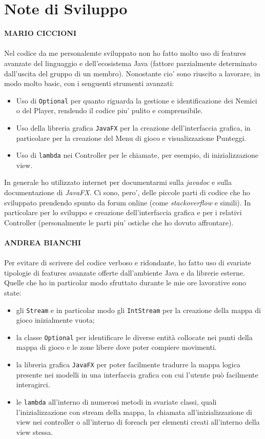 \documentclass[a4paper,12pt]{report}
\begin{document}
\section{Note di Sviluppo}
\textbf{MARIO CICCIONI}
\\ \\
Nel codice da me personalemte sviluppato non ho fatto molto uso di features avanzate del linguaggio e dell'ecosistema Java (fattore parzialmente determinato dall'uscita del gruppo di un membro). 
Nonostante cio' sono riuscito a lavorare, in modo molto basic, con i senguenti strumenti avanzati:
\begin{itemize}
    \item Uso di \verb|Optional| per quanto riguarda la gestione e identificazione dei Nemici o del Player, rendendo il codice piu' pulito e comprensibile.
    \item Uso della libreria grafica \verb|JavaFX| per la creazione dell'interfaccia grafica, in particolare per la creazione del Menu di gioco e visualizzazione Punteggi.
    \item Uso di \verb|lambda| nei Controller per le chiamate, per esempio, di inizializzazione view.
\end{itemize}
In generale ho utilizzato internet per documentarmi sulla \textit{javadoc} e sulla documentazione di \textit{JavaFX}. Ci sono, pero', delle piccole parti di codice che ho sviluppato prendendo spunto da forum online (come \textit{stackoverflow} e simili). In particolare per lo sviluppo e creazione dell'interfaccia grafica e per i relativi Controller (personalmente le parti piu' ostiche che ho dovuto affrontare).
\\ \\
\textbf{ANDREA BIANCHI}
\\ \\
Per evitare di scrivere del codice verboso e ridondante, ho fatto uso di svariate tipologie di features avanzate offerte dall'ambiente Java e da librerie esterne. 
Quelle che ho in particolar modo sfruttato durante le mie ore lavorative sono state:
\begin{itemize}
    \item gli \verb|Stream| e in particolar modo gli \verb|IntStream| per la creazione della mappa di gioco inizialmente vuota;
    \item la classe \verb|Optional| per identificare le diverse entità collocate nei punti della mappa di gioco e le zone libere dove poter compiere movimenti.
    \item la libreria grafica \verb|JavaFX| per poter facilmente tradurre la mappa logica presente nei modelli in una interfaccia grafica con cui l'utente può facilmente interagirci.
    \item le \verb|lambda| all'interno di numerosi metodi in svariate classi, quali l'inizializzazione con stream della mappa, la chiamata all'inizializzazione di view nei controller o all'interno di foreach per elementi creati all'interno della view stessa.
\end{itemize}
\end{document}

